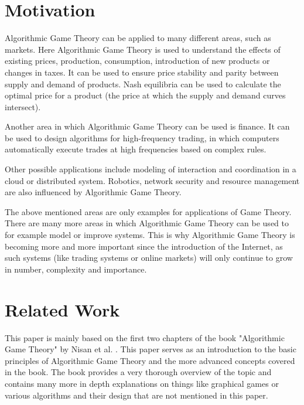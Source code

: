 \section{Motivation}
Algorithmic Game Theory can be applied to many different areas, such as markets. Here Algorithmic Game Theory is used to understand the effects of existing prices, production, consumption, introduction of new products or changes in taxes. It can be used to ensure price stability and parity between supply and demand of products. Nash equilibria can be used to calculate the optimal price for a product (the price at which the supply and demand curves intersect).

Another area in which Algorithmic Game Theory can be used is finance. It can be used to design algorithms for high-frequency trading, in which computers automatically execute trades at high frequencies based on complex rules.

Other possible applications include modeling of interaction and coordination in a cloud or distributed system. Robotics, network security and resource management are also influenced by Algorithmic Game Theory.

The above mentioned areas are only examples for applications of Game Theory. There are many more areas in which Algorithmic Game Theory can be used to for example model or improve systems. This is why Algorithmic Game Theory is becoming more and more important since the introduction of the Internet, as such systems (like trading systems or online markets) will only continue to grow in number, complexity and importance.

\section{Related Work}
This paper is mainly based on the first two chapters of the book "Algorithmic Game Theory" by Nisan et al. \autocite{agt}. This paper serves as an introduction to the basic principles of Algorithmic Game Theory and the more advanced concepts covered in the book. The book provides a very thorough overview of the topic and contains many more in depth explanations on things like graphical games or various algorithms and their design that are not mentioned in this paper. 